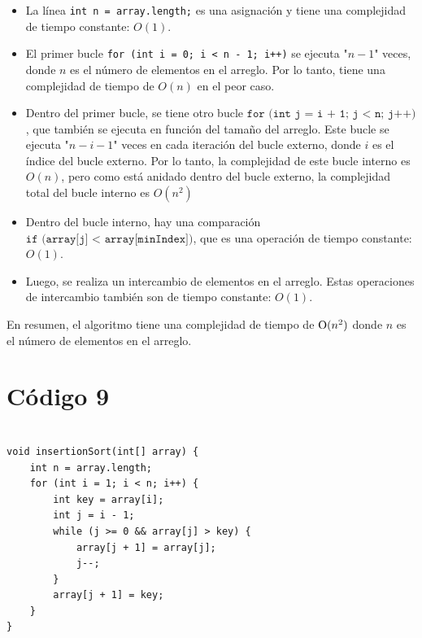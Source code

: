 \documentclass[a4paper,onecolumn,10pt]{article}
\begin{document}
\begin{itemize}

    \item La línea \texttt{int n = array.length;} es una asignación y tiene una complejidad de tiempo constante: $O(1)$.

    \item El primer bucle \texttt{for (int i = 0; i < n - 1; i++)} se ejecuta "$n-1$" veces, donde $n$ es el número de elementos en el arreglo. Por lo tanto, tiene una complejidad de tiempo de $O(n)$ en el peor caso.

    \item Dentro del primer bucle, se tiene otro bucle $\texttt{for (int j = i + 1; j < n; j++)}$, que también se ejecuta en función del tamaño del arreglo. Este bucle se ejecuta "$n-i-1$" veces en cada iteración del bucle externo, donde $i$ es el índice del bucle externo. Por lo tanto, la complejidad de este bucle interno es $O(n)$, pero como está anidado dentro del bucle externo, la complejidad total del bucle interno es $O(n^2)$ 

    \item Dentro del bucle interno, hay una comparación  $\texttt{if (array[j] < array[minIndex])}$, que es una operación de tiempo constante: $O(1)$.

    \item Luego, se realiza un intercambio de elementos en el arreglo. Estas operaciones de intercambio también son de tiempo constante: $O(1)$.

\end{itemize}

En resumen, el algoritmo tiene una complejidad de tiempo de $\text O(n^2)$ donde $n$ es el número de elementos en el arreglo.

\section{Código 9}

\begin{verbatim}

void insertionSort(int[] array) {
    int n = array.length;
    for (int i = 1; i < n; i++) {
        int key = array[i];
        int j = i - 1;
        while (j >= 0 && array[j] > key) {
            array[j + 1] = array[j];
            j--;
        }
        array[j + 1] = key;
    }
}

\end{verbatim}
\end{document}

